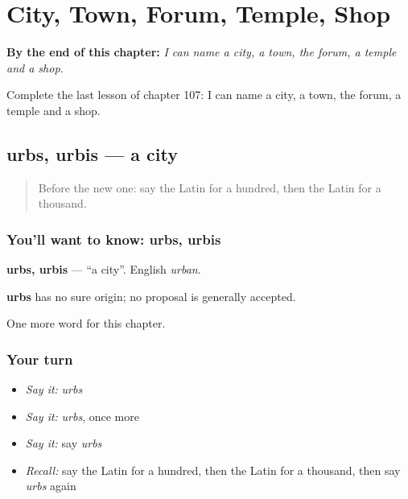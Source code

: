 
\chapter{City, Town, Forum, Temple, Shop}
\label{ch:la-city-town-forum-temple-shop}

\begin{chapteropening}
\textbf{By the end of this chapter:} \emph{I can name a city, a town, the forum, a temple and a shop.}

Complete the last lesson of chapter 107: I can name a city, a town, the forum, a temple and a shop.
\end{chapteropening}

\section[urbs, urbis]{urbs, urbis — a city}

\label{lesson:LA-C107-urbs}



\begin{quote}
Before the new one: say the Latin for a hundred, then the Latin for a thousand.
\end{quote}

\subsection*{You'll want to know: urbs, urbis}
\textbf{urbs, urbis} — \textquotedblleft{}a city\textquotedblright{}. English \emph{urban}.

\begin{cousinweb}
\textbf{urbs} has no sure origin; no proposal is generally accepted.
\end{cousinweb}

\begin{grammarlens}[title={What you've built}]
One more word for this chapter.
\end{grammarlens}

\subsection*{Your turn}
\begin{itemize}
\raggedright
  \item \emph{Say it:} \emph{urbs}
  \item \emph{Say it:} \emph{urbs}, once more
  \item \emph{Say it:} say \emph{urbs}
  \item \emph{Recall:} say the Latin for a hundred, then the Latin for a thousand, then say \emph{urbs} again
\end{itemize}

